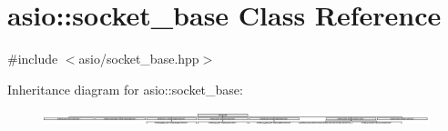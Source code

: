 \hypertarget{classasio_1_1socket__base}{}\section{asio\+:\+:socket\+\_\+base Class Reference}
\label{classasio_1_1socket__base}


{\ttfamily \#include $<$asio/socket\+\_\+base.\+hpp$>$}

Inheritance diagram for asio\+:\+:socket\+\_\+base\+:\begin{figure}[H]
\begin{center}
\leavevmode
\includegraphics[height=0.368421cm]{classasio_1_1socket__base}
\end{center}
\end{figure}
